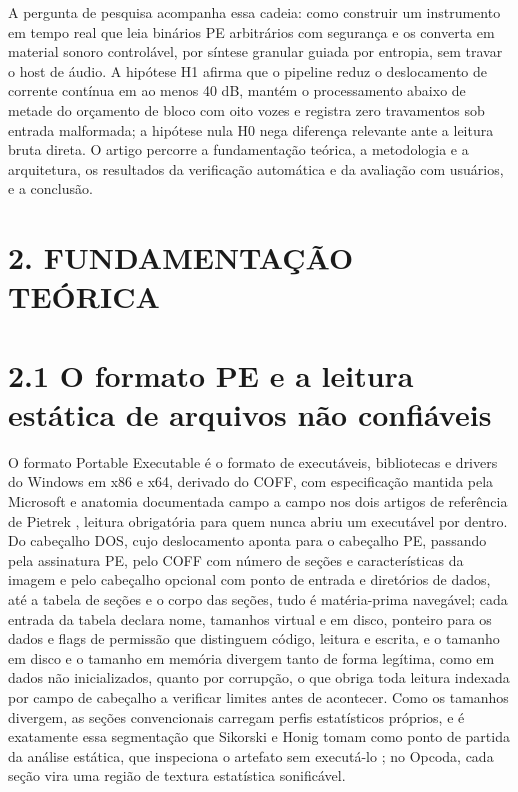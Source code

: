 \documentclass[11pt,a4paper]{article}
\begin{document}
A pergunta de pesquisa acompanha essa cadeia: como construir um instrumento em tempo real que leia binários PE arbitrários com segurança e os converta em material sonoro controlável, por síntese granular guiada por entropia, sem travar o host de áudio. A hipótese H1 afirma que o pipeline reduz o deslocamento de corrente contínua em ao menos 40 dB, mantém o processamento abaixo de metade do orçamento de bloco com oito vozes e registra zero travamentos sob entrada malformada; a hipótese nula H0 nega diferença relevante ante a leitura bruta direta. O artigo percorre a fundamentação teórica, a metodologia e a arquitetura, os resultados da verificação automática e da avaliação com usuários, e a conclusão.


\section*{2. FUNDAMENTAÇÃO TEÓRICA}

\section*{2.1 O formato PE e a leitura estática de arquivos não confiáveis}

O formato Portable Executable é o formato de executáveis, bibliotecas e drivers do Windows em x86 e x64, derivado do COFF, com especificação mantida pela Microsoft \cite{microsoftpe} e anatomia documentada campo a campo nos dois artigos de referência de Pietrek \cite{pietrek1994, pietrek2002}, leitura obrigatória para quem nunca abriu um executável por dentro. Do cabeçalho DOS, cujo deslocamento aponta para o cabeçalho PE, passando pela assinatura PE, pelo COFF com número de seções e características da imagem e pelo cabeçalho opcional com ponto de entrada e diretórios de dados, até a tabela de seções e o corpo das seções, tudo é matéria-prima navegável; cada entrada da tabela declara nome, tamanhos virtual e em disco, ponteiro para os dados e flags de permissão que distinguem código, leitura e escrita, e o tamanho em disco e o tamanho em memória divergem tanto de forma legítima, como em dados não inicializados, quanto por corrupção, o que obriga toda leitura indexada por campo de cabeçalho a verificar limites antes de acontecer. Como os tamanhos divergem, as seções convencionais carregam perfis estatísticos próprios, e é exatamente essa segmentação que Sikorski e Honig tomam como ponto de partida da análise estática, que inspeciona o artefato sem executá-lo \cite{sikorski2012}; no Opcoda, cada seção vira uma região de textura estatística sonificável.
\end{document}

